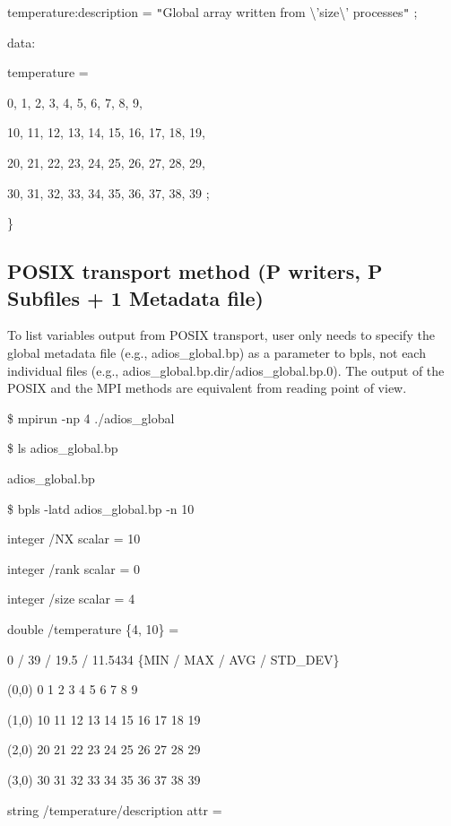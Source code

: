 \parindent=57pt
temperature:description = \texttt{"}Global array written from \textbackslash{}'size\textbackslash{}' 
processes\texttt{"} ;

\parindent=0pt
data:

\parindent=3pt
temperature =

\parindent=7pt
0, 1, 2, 3, 4, 5, 6, 7, 8, 9,

10, 11, 12, 13, 14, 15, 16, 17, 18, 19,

\parindent=14pt
20, 21, 22, 23, 24, 25, 26, 27, 28, 29,

\parindent=7pt
30, 31, 32, 33, 34, 35, 36, 37, 38, 39 ;

\parindent=0pt
\}\label{HToc182553449}

\subsection{POSIX transport method (P writers, P Subfiles + 1 Metadata file)}

To list variables output from POSIX transport, user only needs to specify the global 
metadata file (e.g., adios\_global.bp) as a parameter to bpls, not each individual 
files (e.g., adios\_global.bp.dir/adios\_global.bp.0). The output of the POSIX 
and the MPI methods are equivalent from reading point of view. 

\$ mpirun -np 4 ./adios\_global

\$ ls adios\_global.bp 

adios\_global.bp

\$  bpls -latd adios\_global.bp -n 10

integer    /NX                       scalar = 10

\parindent=3pt
integer    /rank                     scalar = 0

integer    /size                     scalar = 4

\parindent=7pt
double     /temperature              \{4, 10\} = 

\parindent=0pt
0 / 39 / 19.5 / 11.5434  \{MIN / MAX / AVG / STD\_DEV\}

\parindent=14pt
(0,0)    0 1 2 3 4 5 6 7 8 9

(1,0)    10 11 12 13 14 15 16 17 18 19

\parindent=28pt
(2,0)    20 21 22 23 24 25 26 27 28 29

\parindent=14pt
(3,0)    30 31 32 33 34 35 36 37 38 39

\parindent=7pt
string     /temperature/description  attr   = 

